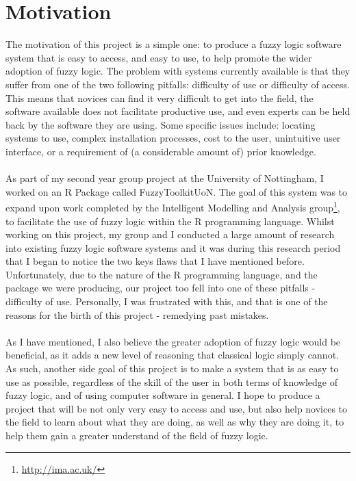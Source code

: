\section{Motivation}
The motivation of this project is a simple one: to produce a fuzzy logic software system that is easy to access, and easy to use, to help promote the wider adoption of fuzzy logic. The problem with systems currently available is that they suffer from one of the two following pitfalls: difficulty of use or difficulty of access. This means that novices can find it very difficult to get into the field, the software available does not facilitate productive use, and even experts can be held back by the software they are using. Some specific issues include: locating systems to use, complex installation processes, cost to the user, unintuitive user interface, or a requirement of (a considerable amount of) prior knowledge. 
\ \\
\ \\
As part of my second year group project at the University of Nottingham, I worked on an R Package called FuzzyToolkitUoN. The goal of this system was to expand upon work completed by the Intelligent Modelling and Analysis group\footnote{\url{http://ima.ac.uk/}}, to facilitate the use of fuzzy logic within the R programming language. Whilst working on this project, my group and I conducted a large amount of research into existing fuzzy logic software systems and it was during this research period that I began to notice the two keys flaws that I have mentioned before. Unfortunately, due to the nature of the R programming language, and the package we were producing, our project too fell into one of these pitfalls - difficulty of use. Personally, I was frustrated with this, and that is one of the reasons for the birth of this project - remedying past mistakes.
\ \\
\ \\
As I have mentioned, I also believe the greater adoption of fuzzy logic would be beneficial, as it adds a new level of reasoning that classical logic simply cannot. As such, another side goal of this project is to make a system that is as easy to use as possible, regardless of the skill of the user in both terms of knowledge of fuzzy logic, and of using computer software in general. I hope to produce a project that will be not only very easy to access and use, but also help novices to the field to learn about what they are doing, as well as why they are doing it, to help them gain a greater understand of the field of fuzzy logic.
\ \\
